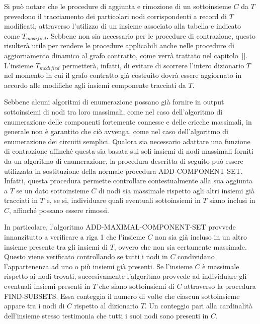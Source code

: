 

Si pu\`o notare che le procedure di aggiunta e rimozione di un sottoinsieme $C$ da $T$ prevedono il tracciamento
dei particolari nodi corrispondenti a record di $T$ modificati, attraverso l'utilizzo di un insieme associato
alla tabella e indicato come $T_{modified}$.
Sebbene non sia necessario per le procedure di contrazione, questo risulterà utile per rendere le procedure
applicabili anche nelle procedure di aggiornamento dinamico al grafo contratto, come verrà trattato nel capitolo~\ref{}.
L'insieme $T_{modified}$ permetterà, infatti, di evitare di scorrere l'intero dizionario $T$ nel momento in cui il
grafo contratto già costruito dovrà essere aggiornato in accordo alle modifiche agli insiemi componente tracciati
da $T$. \newline


Sebbene alcuni algoritmi di enumerazione possano già fornire in output sottoinsiemi di nodi tra loro massimali,
come nel caso dell'algoritmo di enumerazione delle componenti fortemente connesse e delle cricche massimali,
in generale non è garantito che ciò avvenga, come nel caso dell'algoritmo di enumerazione dei circuiti semplici.
Qualora sia necessario adattare una funzione di contrazione affinché questa sia basata sui soli insiemi di nodi
massimali forniti da un algoritmo di enumerazione, la procedura descritta di seguito può essere utilizzata in
sostituzione della normale procedura ADD-COMPONENT-SET.
Infatti, questa procedura permette controllare contestualmente alla sua aggiunta a $T$ se un dato sottoinsieme $C$ di
nodi sia massimale rispetto agli altri insiemi già tracciati in $T$ e, se si, individuare quali eventuali sottoinsiemi
in $T$ siano inclusi in $C$, affinché possano essere rimossi.




In particolare, l'algoritmo ADD-MAXIMAL-COMPONENT-SET provvede innanzitutto a verificare a riga 1 che l'insieme $C$ non
sia gi\`a incluso in un altro insieme presente tra gli insiemi di $T$, ovvero che non sia certamente
massimale.
Questo viene verificato controllando se tutti i nodi in $C$ condividano l'appartenenza ad uno o pi\`u insiemi gi\`a
presenti. \newline
Se l'insieme $C$ \`e massimale rispetto ai nodi trovati, succesivamente l'algoritmo provvede ad individuare
gli eventuali insiemi presenti in $T$ che siano sottoinsiemi di $C$ attraverso la procedura FIND-SUBSETS.
Essa conteggia il numero di volte che ciascun sottoinsieme appare tra i nodi di $C$ rispetto al dizionario $T$.
Un conteggio pari alla cardinalit\`a dell'insieme stesso testimonia che tutti i suoi nodi sono presenti in $C$.

